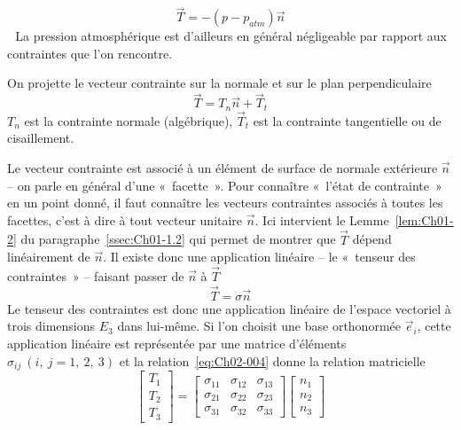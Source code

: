 \begin{equation}
    \vec{T} = -\left( p - p_{atm} \right) \vec{n}
    \label{eq:Ch02-002}
\end{equation}­ ­
La pression atmosphérique est d'ailleurs en général négligeable par rapport aux contraintes que l'on rencontre.

On projette le vecteur contrainte sur la normale et sur le plan perpendiculaire
\begin{equation}
    \vec{T} = T_{n}\vec{n} + \vec{T}_{t}
    \label{eq:Ch02-003}
\end{equation}
$T_n$ est la contrainte normale (algébrique), $\vec{T}_t$ est la contrainte tangentielle ou de cisaillement. 

Le vecteur contrainte est associé à un élément de surface de normale extérieure $\vec{n}$ -- on parle en général d'une «~facette~». 
Pour connaître «~l'état de contrainte~» en un point donné, il faut connaître les vecteurs contraintes associés à toutes les facettes, c'est à dire à tout vecteur unitaire $\vec{n}$.
Ici intervient le Lemme~\ref{lem:Ch01-2} du paragraphe~\ref{ssec:Ch01-1.2} qui permet de montrer que $\vec{T}$ dépend linéairement de $\vec{n}$.
Il existe donc une application linéaire -- le «~tenseur des contraintes~» -- faisant passer de $\vec{n}$ à $\vec{T}$
\begin{equation}
    \vec{T} = \mathbb{\sigma} \vec{n}
    \label{eq:Ch02-004}
\end{equation}
Le tenseur des contraintes est donc une application linéaire de l'espace vectoriel à trois dimensions $E_3$ dans lui-même.
Si l'on choisit une base orthonormée $\vec{e}_i$, cette application linéaire est représentée par une matrice d'éléments $\sigma_{ij}\ (i,\ j = 1,\ 2,\ 3)$  et la relation~\eqref{eq:Ch02-004} donne la relation matricielle
\begin{equation*}
    \begin{bmatrix}
        T_1\\
        T_2\\
        T_3
    \end{bmatrix}
    =
    \begin{bmatrix}
        \sigma_{11} & \sigma_{12} & \sigma_{13}\\
        \sigma_{21} & \sigma_{22} & \sigma_{23}\\
        \sigma_{31} & \sigma_{32} & \sigma_{33}
    \end{bmatrix}
    \begin{bmatrix}
        n_1\\
        n_2\\
        n_3
    \end{bmatrix}
\end{equation*}
